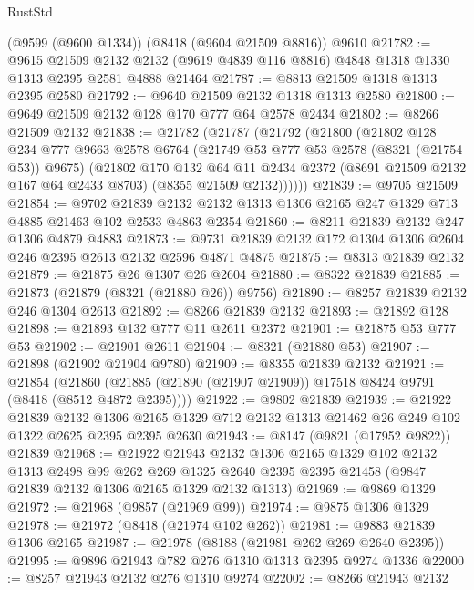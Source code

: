 \begin{lexlean}{RustStd}
\begin{coremodule}
    (@9599 (@9600 @1334))
    (@8418 (@9604 @21509 @8816))
    @9610
@21782 := @9615
    @21509
    @2132
    @2132
    (@9619 @4839 @116 @8816)
    @4848
    @1318
    @1330
    @1313
    @2395
    @2581
    @4888
    @21464
@21787 := @8813 @21509 @1318 @1313 @2395 @2580
@21792 := @9640 @21509 @2132 @1318 @1313 @2580
@21800 := @9649 @21509 @2132 @128 @170 @777 @64 @2578 @2434
@21802 := @8266 @21509 @2132
@21838 := @21782
    (@21787
      (@21792
        (@21800
          (@21802
            @128
            @234
            @777
            @9663
            @2578
            @6764
            (@21749 @53 @777 @53 @2578 (@8321 (@21754 @53)) @9675)
            (@21802
              @170
              @132
              @64
              @11
              @2434
              @2372
              (@8691 @21509 @2132 @167 @64 @2433 @8703)
              (@8355 @21509 @2132))))))
@21839 := @9705 @21509
@21854 := @9702
    @21839
    @2132
    @2132
    @1313
    @1306
    @2165
    @247
    @1329
    @713
    @4885
    @21463
    @102
    @2533
    @4863
    @2354
@21860 := @8211 @21839 @2132 @247 @1306 @4879 @4883
@21873 := @9731 @21839 @2132 @172 @1304 @1306 @2604 @246 @2395 @2613 @2132 @2596 @4871 @4875
@21875 := @8313 @21839 @2132
@21879 := @21875 @26 @1307 @26 @2604
@21880 := @8322 @21839
@21885 := @21873 (@21879 (@8321 (@21880 @26)) @9756)
@21890 := @8257 @21839 @2132 @246 @1304 @2613
@21892 := @8266 @21839 @2132
@21893 := @21892 @128
@21898 := @21893 @132 @777 @11 @2611 @2372
@21901 := @21875 @53 @777 @53
@21902 := @21901 @2611
@21904 := @8321 (@21880 @53)
@21907 := @21898 (@21902 @21904 @9780)
@21909 := @8355 @21839 @2132
@21921 := @21854
    (@21860 (@21885 (@21890 (@21907 @21909)) @17518 @8424 @9791 (@8418 (@8512 @4872 @2395))))
@21922 := @9802 @21839
@21939 := @21922
    @21839
    @2132
    @1306
    @2165
    @1329
    @712
    @2132
    @1313
    @21462
    @26
    @249
    @102
    @1322
    @2625
    @2395
    @2395
    @2630
@21943 := @8147 (@9821 (@17952 @9822)) @21839
@21968 := @21922
    @21943
    @2132
    @1306
    @2165
    @1329
    @102
    @2132
    @1313
    @2498
    @99
    @262
    @269
    @1325
    @2640
    @2395
    @2395
    @21458
    (@9847 @21839 @2132 @1306 @2165 @1329 @2132 @1313)
@21969 := @9869 @1329
@21972 := @21968 (@9857 (@21969 @99))
@21974 := @9875 @1306 @1329
@21978 := @21972 (@8418 (@21974 @102 @262))
@21981 := @9883 @21839 @1306 @2165
@21987 := @21978 (@8188 (@21981 @262 @269 @2640 @2395))
@21995 := @9896 @21943 @782 @276 @1310 @1313 @2395 @9274 @1336
@22000 := @8257 @21943 @2132 @276 @1310 @9274
@22002 := @8266 @21943 @2132

\end{coremodule}
\end{lexlean}
